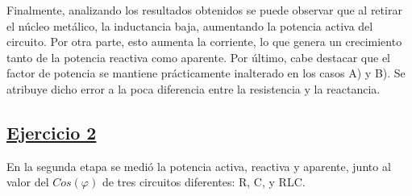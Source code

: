 \documentclass[a4paper]{article}
\begin{document}
Finalmente, analizando los resultados obtenidos se puede observar que al retirar el núcleo metálico, la inductancia baja, aumentando la potencia activa del circuito. Por otra parte, esto aumenta la corriente, lo que genera un crecimiento tanto de la potencia reactiva como aparente. Por último, cabe destacar que el factor de potencia se mantiene prácticamente inalterado en los casos A) y B). Se atribuye dicho error a la poca diferencia entre la resistencia y la reactancia.

\subsection*{\underline{Ejercicio 2}}

En la segunda etapa se medió la potencia activa, reactiva y aparente, junto al valor del $Cos(\varphi)$ de tres circuitos diferentes: R, C, y RLC.
\end{document}

